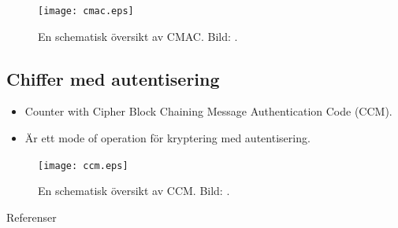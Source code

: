 \documentclass{beamer}
\theoremstyle{definition}
\begin{document}
\begin{frame}{\insertsubsectionhead}
  \begin{figure}
    \centering
    \texttt{[image: cmac.eps]}
    \caption{En schematisk översikt av CMAC.
      Bild: \citep{Stallings2013nse}.}
  \end{figure}
\end{frame}

\subsection{Chiffer med autentisering}

\begin{frame}{\insertsubsectionhead}
  \begin{itemize}
    \item Counter with Cipher Block Chaining Message Authentication Code (CCM).

    \item Är ett mode of operation för kryptering med autentisering.

  \end{itemize}
\end{frame}

\begin{frame}{\insertsubsectionhead}
  \begin{figure}
    \centering
    \texttt{[image: ccm.eps]}
    \caption{En schematisk översikt av CCM.
      Bild: \citep{Stallings2013nse}.}
  \end{figure}
\end{frame}


%


%
%



\begin{frame}[allowframebreaks]{Referenser}
	\small
  \printbibliography
\end{frame}
\end{document}
